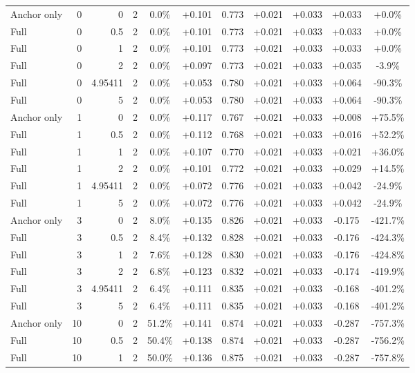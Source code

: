 \begin{table}[htbp]
\begin{tabular}{lrrrccccccc}
Anchor only & 0 & 0 & 2 & 0.0\% & +0.101 & 0.773 & +0.021 & +0.033 & +0.033 & +0.0\% \\
Full & 0 & 0.5 & 2 & 0.0\% & +0.101 & 0.773 & +0.021 & +0.033 & +0.033 & +0.0\% \\
Full & 0 & 1 & 2 & 0.0\% & +0.101 & 0.773 & +0.021 & +0.033 & +0.033 & +0.0\% \\
Full & 0 & 2 & 2 & 0.0\% & +0.097 & 0.773 & +0.021 & +0.033 & +0.035 & -3.9\% \\
Full & 0 & 4.95411 & 2 & 0.0\% & +0.053 & 0.780 & +0.021 & +0.033 & +0.064 & -90.3\% \\
Full & 0 & 5 & 2 & 0.0\% & +0.053 & 0.780 & +0.021 & +0.033 & +0.064 & -90.3\% \\
Anchor only & 1 & 0 & 2 & 0.0\% & +0.117 & 0.767 & +0.021 & +0.033 & +0.008 & +75.5\% \\
Full & 1 & 0.5 & 2 & 0.0\% & +0.112 & 0.768 & +0.021 & +0.033 & +0.016 & +52.2\% \\
Full & 1 & 1 & 2 & 0.0\% & +0.107 & 0.770 & +0.021 & +0.033 & +0.021 & +36.0\% \\
Full & 1 & 2 & 2 & 0.0\% & +0.101 & 0.772 & +0.021 & +0.033 & +0.029 & +14.5\% \\
Full & 1 & 4.95411 & 2 & 0.0\% & +0.072 & 0.776 & +0.021 & +0.033 & +0.042 & -24.9\% \\
Full & 1 & 5 & 2 & 0.0\% & +0.072 & 0.776 & +0.021 & +0.033 & +0.042 & -24.9\% \\
Anchor only & 3 & 0 & 2 & 8.0\% & +0.135 & 0.826 & +0.021 & +0.033 & -0.175 & -421.7\% \\
Full & 3 & 0.5 & 2 & 8.4\% & +0.132 & 0.828 & +0.021 & +0.033 & -0.176 & -424.3\% \\
Full & 3 & 1 & 2 & 7.6\% & +0.128 & 0.830 & +0.021 & +0.033 & -0.176 & -424.8\% \\
Full & 3 & 2 & 2 & 6.8\% & +0.123 & 0.832 & +0.021 & +0.033 & -0.174 & -419.9\% \\
Full & 3 & 4.95411 & 2 & 6.4\% & +0.111 & 0.835 & +0.021 & +0.033 & -0.168 & -401.2\% \\
Full & 3 & 5 & 2 & 6.4\% & +0.111 & 0.835 & +0.021 & +0.033 & -0.168 & -401.2\% \\
Anchor only & 10 & 0 & 2 & 51.2\% & +0.141 & 0.874 & +0.021 & +0.033 & -0.287 & -757.3\% \\
Full & 10 & 0.5 & 2 & 50.4\% & +0.138 & 0.874 & +0.021 & +0.033 & -0.287 & -756.2\% \\
Full & 10 & 1 & 2 & 50.0\% & +0.136 & 0.875 & +0.021 & +0.033 & -0.287 & -757.8\% \\

\end{tabular}
\end{table}
